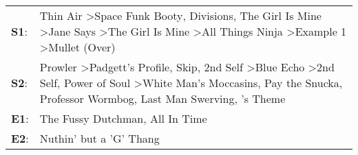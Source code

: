 \begin{supertabular}{p{0.03\textwidth}p{0.92\textwidth}}
 \textbf{S1}:  &                                                                                                  Thin Air\textsuperscript{} \textgreater \enspace Space Funk Booty\textsuperscript{}, \enspace Divisions\textsuperscript{}, \enspace The Girl Is Mine\textsuperscript{} \textgreater \enspace Jane Says\textsuperscript{} \textgreater \enspace The Girl Is Mine\textsuperscript{} \textgreater \enspace All Things Ninja\textsuperscript{} \textgreater \enspace Example 1\textsuperscript{} \textgreater \enspace Mullet (Over)\textsuperscript{}  \enspace  \\
 \textbf{S2}:  &  Prowler\textsuperscript{} \textgreater \enspace Padgett's Profile\textsuperscript{}, \enspace Skip\textsuperscript{}, \enspace 2nd Self\textsuperscript{} \textgreater \enspace Blue Echo\textsuperscript{} \textgreater \enspace 2nd Self\textsuperscript{}, \enspace Power of Soul\textsuperscript{} \textgreater \enspace White Man's Moccasins\textsuperscript{}, \enspace Pay the Snucka\textsuperscript{}, \enspace Professor Wormbog\textsuperscript{}, \enspace Last Man Swerving\textsuperscript{}, 's Theme\textsuperscript{}  \enspace  \\
 \textbf{E1}:  &                                                                                                                                                                                                                                                                                                                                                                                                                                                                        The Fussy Dutchman\textsuperscript{}, \enspace All In Time\textsuperscript{}  \enspace  \\
 \textbf{E2}:  &                                                                                                                                                                                                                                                                                                                                                                                                                                                                                                           Nuthin' but a 'G' Thang\textsuperscript{}  \enspace  \\
\end{supertabular}
